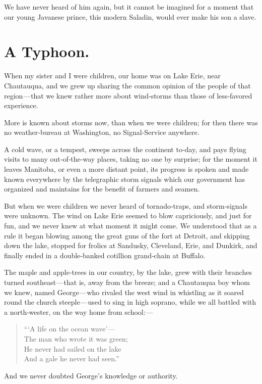 \documentclass[12pt]{book}
\begin{document}
We have never heard of him again, but it cannot be imagined for a moment
that our young Javanese prince, this modern Saladin, would ever make his son a
slave.

\chapter{A Typhoon.}

When my sister and I were children, our home was on Lake Erie, near Chautauqua,
and we grew up sharing the common opinion of the people of that region — that
we knew rather more about wind‐storms than those of less‐favored experience.

More is known about storms now, than when we were children; for then there
was no weather‐bureau at Washington, no Signal‐Service anywhere.

A cold wave, or a tempest, sweeps across the continent to‐day, and pays flying
visits to many out‐of‐the‐way places, taking no one by surprise; for the moment
it leaves Manitoba, or even a more distant point, its progress is spoken and made
known everywhere by the telegraphic storm signals which our government has
organized and maintains for the benefit of farmers and seamen.

But when we were children we never heard of tornado‐traps, and storm‐signals
were unknown. The wind on Lake Erie seemed to blow capriciously, and just for
fun, and we never knew at what moment it might come. We understood that as a
rule it began blowing among the great guns of the fort at Detroit, and skipping
down the lake, stopped for frolics at Sandusky, Cleveland, Erie, and Dunkirk, and
finally ended in a double‐banked cotillion grand‐chain at Buffalo.

The maple and apple‐trees in our country, by the lake, grew with their branches
turned southeast — that is, away from the breeze; and a Chautauqua boy whom
we knew, named George — who rivaled the west wind in whistling as it soared
round the church steeple — used to sing in high soprano, while we all battled with
a north‐wester, on the way home from school: —
\begin{quote}
“‘A life on the ocean wave’ — \\
The man who wrote it was green; \\
He never had sailed on the lake \\
And a gale he never had seen.”
\end{quote}
And we never doubted George’s knowledge or authority.
\end{document}
